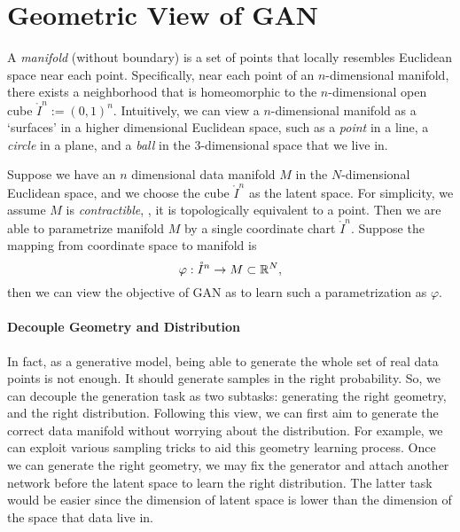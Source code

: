 \section{Geometric View of GAN} \label{sec:geom}

A \emph{manifold} (without boundary) is a set of points that
locally resembles Euclidean space near each point.
Specifically,
near each point of an $n$-dimensional manifold,
there exists a neighborhood that is homeomorphic to the $n$-dimensional open
cube $\mathring{I}^n:=(0,1)^n$.
Intuitively,
we can view a $n$-dimensional manifold as a `surfaces'
in a higher dimensional Euclidean space,
such as a \emph{point} in a line,
a \emph{circle} in a plane,
and a \emph{ball} in the $3$-dimensional space that we live in.

Suppose we have an $n$ dimensional data manifold $M$ in the $N$-dimensional
Euclidean space,
and we choose the cube $\mathring{I}^n$ as the latent space.
For simplicity,
we assume $M$ is \emph{contractible},
\ie,
it is topologically equivalent to a point.
Then we are able to parametrize manifold $M$ by a
single coordinate chart $\mathring{I}^n$.
Suppose the mapping from coordinate space to manifold is
\begin{equation}
    \varphi:\mathring{I}^n\to M\subset {\mathbb{R}}^N,
\end{equation}
then we can view the objective of GAN as to learn such a
parametrization as $\varphi$.

\paragraph{Decouple Geometry and Distribution}
In fact,
as a generative model,
being able to generate the whole set of real data points is not enough.
It should generate samples in the right probability.
So,
we can decouple the generation task as two subtasks:
generating the right geometry,
and the right distribution.
Following this view,
we can first aim to generate the correct data manifold
without worrying about the distribution.
For example,
we can exploit various sampling tricks to aid this geometry learning process.
Once we can generate the right geometry,
we may fix the generator and attach another network before the latent space
to learn the right distribution.
The latter task would be easier since the dimension of latent space is
lower than the dimension of the space that data live in.




